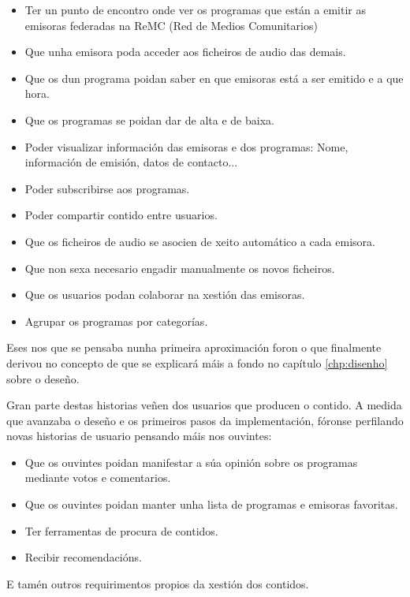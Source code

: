 \begin{itemize}
	\item Ter un punto de encontro onde ver os programas que están a emitir as emisoras federadas na ReMC (Red de Medios Comunitarios)
	\item Que unha emisora poda acceder aos ficheiros de audio das demais.
	\item Que os  dun programa poidan saber en que emisoras está a ser emitido e a que hora.
	\item Que os programas se poidan dar de alta e de baixa.
	\item Poder visualizar información das emisoras e dos programas: Nome, información de emisión, datos de contacto...
	\item Poder subscribirse aos programas.
	\item Poder compartir contido entre usuarios.
	\item Que os ficheiros de audio se asocien de xeito automático a cada emisora.
	\item Que non sexa necesario engadir manualmente os novos ficheiros.
	\item Que os usuarios podan colaborar na xestión das emisoras.
	\item Agrupar os programas por categorías.
\end{itemize}

Eses  nos que se pensaba nunha primeira aproximación foron o que finalmente derivou no concepto de  que se explicará máis a fondo no capítulo \ref{chp:disenho} sobre o deseño.

Gran parte destas historias veñen dos usuarios que producen o contido. A medida que avanzaba o deseño e os primeiros pasos da implementación, fóronse perfilando novas historias de usuario pensando máis nos ouvintes:

\begin{itemize}
	\item Que os ouvintes poidan manifestar a súa opinión sobre os programas mediante votos e comentarios.
	\item Que os ouvintes poidan manter unha lista de programas e emisoras favoritas.
	\item Ter ferramentas de procura de contidos.
	\item Recibir recomendacións.  
\end{itemize}  

E tamén outros requirimentos propios da xestión dos contidos.


